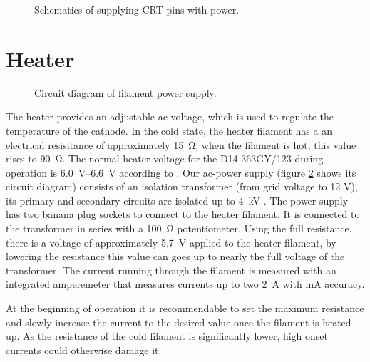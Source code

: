 \begin{figure}[H]
	\centering
	
	\begin{circuitikz}[european]
		
	\end{circuitikz}

	\caption{Schematics of supplying CRT pins with power.}
	\label{fig:schematics of wiring}
\end{figure}


\section{Heater}
\label{sec:Heater}

\begin{figure}[ht]
	\centering
	
	\begin{circuitikz}%
		
	\end{circuitikz}

	\caption{Circuit diagram of filament power supply.}
	\label{fig:heater_circuit}
\end{figure}

The heater provides an adjustable ac voltage, which is used to regulate the temperature of the cathode. In the cold state, the heater filament has a an electrical resisitance of approximately \SI{15}{\ohm}, when the filament is hot, this value rises to \SI{90}{\ohm}. The normal heater voltage for the D14-363GY/123 during  operation is \SIrange{6.0}{6.6}{\volt} according to \cite{D14363GY123-manual}. 
Our ac-power supply (figure \ref{fig:heater_circuit} shows its circuit diagram) consists of an isolation transformer (from grid voltage to 12 V), its primary  and secondary circuits are isolated up to \SI{4}{\kilo\volt} \cite{DS44231-DataSheet}. The power supply has two  banana plug sockets to connect to the heater filament. 
It is connected to the transformer in series with a \SI{100}{\ohm} potentiometer. Using the full resistance, there is a voltage of approximately \SI{5.7}{\volt} applied to the heater filament, by lowering the resistance this value can goes up to nearly the full voltage of the transformer. 
The current running through the filament is measured with an integrated amperemeter \cite{ACA-20PC-manual} that measures currents up to two \SI{2}{\ampere} with \si{\milli\ampere} accuracy.

At the beginning of operation it is recommendable to set the maximum resistance and slowly increase the current to the desired value once the filament is heated up. As the resistance of the cold filament is significantly lower, high onset currents could otherwise damage it.  